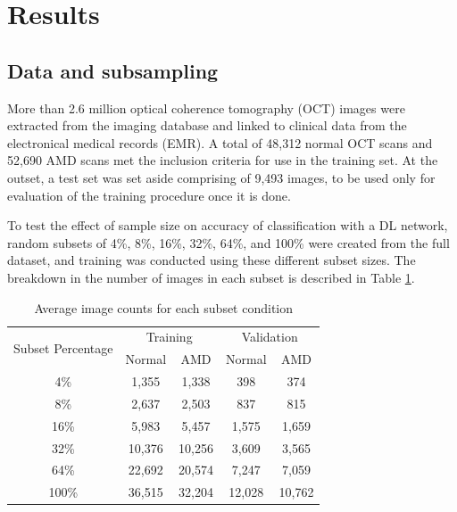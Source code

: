 \section{Results}

\subsection{Data and subsampling}

More than 2.6 million optical coherence tomography (OCT) images were extracted
from the imaging database and linked to clinical data from the electronical
medical records (EMR). A total of 48,312 normal OCT scans and 52,690 AMD scans
met the inclusion criteria for use in the training set. At the outset, a test
set was set aside comprising of 9,493 images, to be used only for evaluation of
the training procedure once it is done.

To test the effect of sample size on accuracy of classification with a DL
network, random subsets of 4\%, 8\%, 16\%, 32\%, 64\%, and 100\% were created
from the full dataset, and training was conducted using these different subset
sizes. The breakdown in the number of images in each subset is described in
Table \ref{table_counts}.

\begin{table}[!t]
\renewcommand{\arraystretch}{1.1}
\caption{Average image counts for each subset condition}
\label{table_counts}
\centering
\begin{tabular}{ccccc}
\hline
\multirow{2}{*}{Subset Percentage} & \multicolumn{2}{c}{Training} & \multicolumn{2}{c}{Validation}  \\
	 & Normal & AMD & Normal & AMD \\
\hline
4\%   & 1,355 & 1,338 & 398 & 374 \\
8\%   & 2,637 & 2,503 & 837 & 815 \\
16\%   & 5,983 & 5,457 & 1,575 & 1,659 \\
32\%   & 10,376 & 10,256 & 3,609 & 3,565 \\
64\%   & 22,692 & 20,574 & 7,247 & 7,059 \\
100\%   & 36,515 & 32,204 & 12,028 & 10,762 \\
\hline
\end{tabular}
\end{table}

